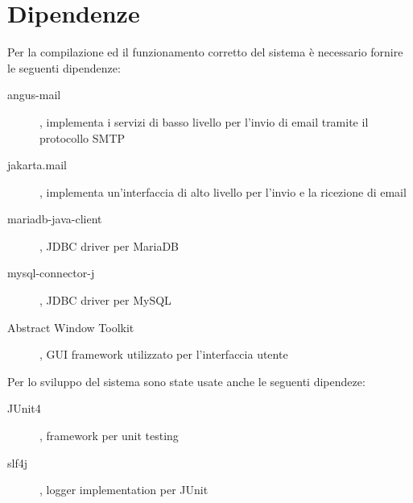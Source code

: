 \section{Dipendenze}
\label{sec:dependency}
Per la compilazione ed il funzionamento corretto del sistema è
necessario fornire le seguenti dipendenze:
\begin{description}
\item[angus-mail], implementa i servizi di basso livello per l'invio di email tramite il protocollo SMTP
\item[jakarta.mail], implementa un'interfaccia di alto livello per l'invio e la ricezione di email
\item[mariadb-java-client], JDBC driver per MariaDB
\item[mysql-connector-j], JDBC driver per MySQL
\item[Abstract Window Toolkit], GUI framework utilizzato per l'interfaccia utente
\end{description}

Per lo sviluppo del sistema sono state usate anche le seguenti
dipendeze:
\begin{description}
\item[JUnit4], framework per unit testing
\item[slf4j], logger implementation per JUnit
\end{description}
